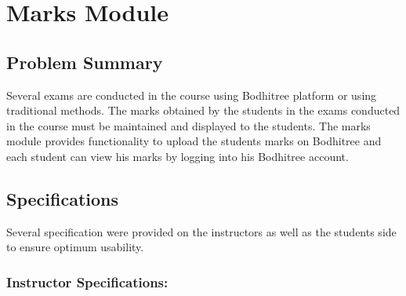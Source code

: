 \section{Marks Module}

\subsection{Problem Summary}

\hspace{0.35cm} Several exams are conducted in the course using Bodhitree platform or using traditional methods. The marks obtained by the students in the exams conducted in the course must be maintained and displayed to the students. The marks module provides functionality to upload the students marks on Bodhitree and each student can view his marks by logging into his Bodhitree account.

\subsection{Specifications}

\hspace{0.35cm} Several specification were provided on the instructors as well as the students side to ensure optimum usability.

\subsubsection*{Instructor Specifications:}

